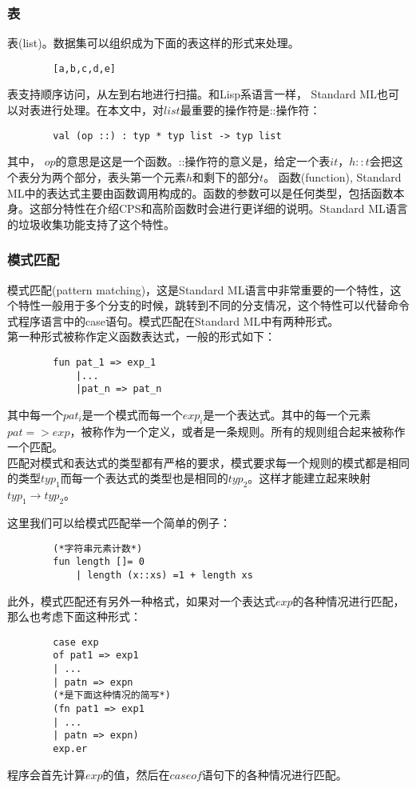 \documentclass[openany,oneside]{book}
\theoremstyle{definition}
\theoremstyle{definition}
\begin{document}
	\subsubsection*{表}
	\indent 表(list)。数据集可以组织成为下面的表这样的形式来处理。
	\begin{lstlisting}
		[a,b,c,d,e]
	\end{lstlisting}
	表支持顺序访问，从左到右地进行扫描。和Lisp系语言一样， Standard ML也可以对表进行处理。在本文中，对\(list\)最重要的操作符是::操作符：
	\begin{lstlisting}
		val (op ::) : typ * typ list -> typ list		
	\end{lstlisting}
	其中， \(op\)的意思是这是一个函数。::操作符的意义是，给定一个表\(it\)，\(h::t\)会把这个表分为两个部分，表头第一个元素$h$和剩下的部分$t$。	
	\indent 函数(function), Standard ML中的表达式主要由函数调用构成的。函数的参数可以是任何类型，包括函数本身。这部分特性在介绍CPS和高阶函数时会进行更详细的说明。Standard ML语言的垃圾收集功能\cite{paulson1996ml-5}支持了这个特性。\\
	\subsubsection*{模式匹配}
	\indent 模式匹配(pattern matching)，这是Standard ML语言中非常重要的一个特性，这个特性一般用于多个分支的时候，跳转到不同的分支情况，这个特性可以代替命令式程序语言中的case语句。模式匹配在Standard ML中有两种形式。\\
	\indent 第一种形式被称作定义函数表达式，一般的形式如下：
	\begin{lstlisting}
		fun pat_1 => exp_1
			|...
			|pat_n => pat_n
	\end{lstlisting}
	其中每一个\(pat_i\)是一个模式而每一个\(exp_i\)是一个表达式。其中的每一个元素 \( pat => exp\)，被称作为一个定义，或者是一条规则。所有的规则组合起来被称作一个匹配。\\
	\indent 匹配对模式和表达式的类型都有严格的要求，模式要求每一个规则的模式都是相同的类型\(typ_1\)而每一个表达式的类型也是相同的\(typ_2\)。这样才能建立起来映射\(typ_1 \rightarrow typ_2\)。
	
	这里我们可以给模式匹配举一个简单的例子：
	\begin{lstlisting}
		(*字符串元素计数*)
		fun length []= 0
			| length (x::xs) =1 + length xs
	\end{lstlisting}
	
	此外，模式匹配还有另外一种格式，如果对一个表达式\(exp\)的各种情况进行匹配，那么也考虑下面这种形式：
	\begin{lstlisting}
		case exp
		of pat1 => exp1
		| ...
		| patn => expn
		(*是下面这种情况的简写*)
		(fn pat1 => exp1
		| ...
		| patn => expn)
		exp.er
	\end{lstlisting}
	程序会首先计算\(exp\)的值，然后在\(case\)\(of\)语句下的各种情况进行匹配。
\end{document}
